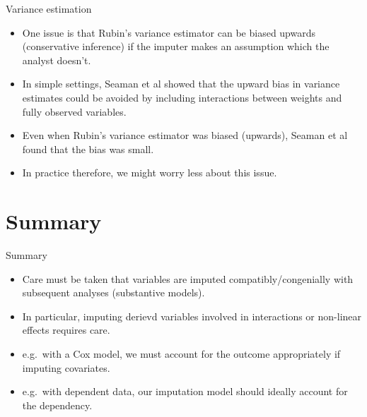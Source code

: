 \documentclass[ignorenonframetext,]{beamer}
\providecommand{\tightlist}{%
  \setlength{\itemsep}{0pt}\setlength{\parskip}{0pt}}
\begin{document}
\begin{frame}{Variance estimation}
\protect\hypertarget{variance-estimation}{}

\begin{itemize}
\tightlist
\item
  One issue is that Rubin's variance estimator can be biased upwards
  (conservative inference) if the imputer makes an assumption which the
  analyst doesn't.
\item
  In simple settings, Seaman et al showed that the upward bias in
  variance estimates could be avoided by including interactions between
  weights and fully observed variables.
\item
  Even when Rubin's variance estimator was biased (upwards), Seaman et
  al found that the bias was small.
\item
  In practice therefore, we might worry less about this issue.
\end{itemize}

\end{frame}

\hypertarget{summary}{%
\section{Summary}\label{summary}}

\begin{frame}{Summary}
\protect\hypertarget{summary-1}{}

\begin{itemize}
\tightlist
\item
  Care must be taken that variables are imputed compatibly/congenially
  with subsequent analyses (substantive models).
\item
  In particular, imputing derievd variables involved in interactions or
  non-linear effects requires care.
\item
  e.g.~with a Cox model, we must account for the outcome appropriately
  if imputing covariates.
\item
  e.g.~with dependent data, our imputation model should ideally account
  for the dependency.
\end{itemize}

\end{frame}
\end{document}
